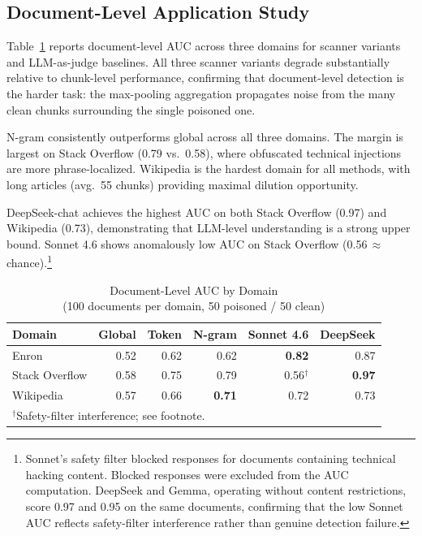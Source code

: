 \documentclass[conference]{IEEEtran}
\begin{document}
\subsection{Document-Level Application Study}

Table~\ref{tab:doclevel} reports document-level AUC across three domains for scanner
variants and LLM-as-judge baselines. All three scanner variants degrade substantially
relative to chunk-level performance, confirming that document-level detection is the
harder task: the max-pooling aggregation propagates noise from the many clean chunks
surrounding the single poisoned one.

N-gram consistently outperforms global across all three domains. The margin is largest
on Stack Overflow (0.79 vs.\ 0.58), where obfuscated technical injections are more
phrase-localized. Wikipedia is the hardest domain for all methods, with long articles
(avg.\ 55 chunks) providing maximal dilution opportunity.

DeepSeek-chat achieves the highest AUC on both Stack Overflow (0.97) and Wikipedia
(0.73), demonstrating that LLM-level understanding is a strong upper bound. Sonnet
4.6 shows anomalously low AUC on Stack Overflow (0.56\,$\approx$\,chance).\footnote{Sonnet's safety filter blocked responses for documents containing technical hacking content. Blocked responses were excluded from the AUC computation. DeepSeek and Gemma, operating without content restrictions, score 0.97 and 0.95 on the same documents, confirming that the low Sonnet AUC reflects safety-filter interference rather than genuine detection failure.}

\begin{table}[t]
\caption{Document-Level AUC by Domain\\
(100 documents per domain, 50 poisoned / 50 clean)}
\label{tab:doclevel}
\centering
\begin{tabular}{lrrrrr}
\toprule
Domain & Global & Token & N-gram & Sonnet 4.6 & DeepSeek \\
\midrule
Enron & 0.52 & 0.62 & 0.62 & \textbf{0.82} & 0.87 \\
Stack Overflow & 0.58 & 0.75 & 0.79 & 0.56$^{\dagger}$ & \textbf{0.97} \\
Wikipedia & 0.57 & 0.66 & \textbf{0.71} & 0.72 & 0.73 \\
\bottomrule
\multicolumn{6}{l}{\footnotesize $^{\dagger}$Safety-filter interference; see footnote.}
\end{tabular}
\end{table}
\end{document}
